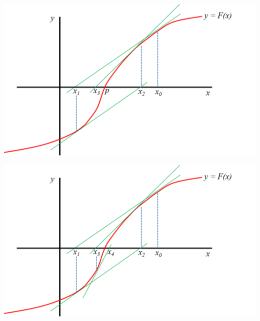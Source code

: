 \documentclass[openany]{book}
\begin{document}
\begin{center}\includegraphics[width=0.9\linewidth]{Plots/U2/nr4} \end{center}

\begin{center}\includegraphics[width=0.9\linewidth]{Plots/U2/nr} \end{center}
\end{document}
